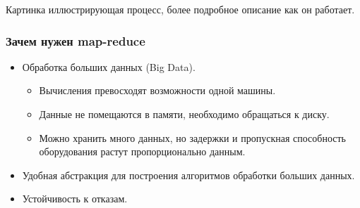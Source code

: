 \documentclass[12pt,a4paper,oneside]{extarticle}
\begin{document}
        Картинка иллюстрирующая процесс, более подробное описание как он работает.

        \subsubsection{Зачем нужен map-reduce}
            \begin{itemize}
                \item Обработка больших данных (Big Data).
                \begin{itemize}
                    \item Вычисления превосходят возможности одной машины.  
                    \item Данные не помещаются в памяти, необходимо обращаться к диску.
                    \item Можно хранить много данных, но задержки и пропускная способность оборудования растут пропорционально данным.
                \end{itemize}
                \item Удобная абстракция для построения алгоритмов обработки больших данных.
                \item Устойчивость к отказам.            
            \end{itemize} 
\end{document}
